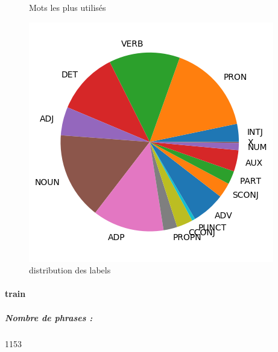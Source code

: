 \begin{figure}[H]
\begin{minipage}{0.48\textwidth}
\begin{tabular}{|l || *{11 }{|c} |}
\end{tabular}
\caption{ Mots les plus utilisés } \label{Fig:muw}\end{minipage} 
\begin{minipage}{0.48\textwidth} \centering
\includegraphics[width=.7\linewidth]{spokentest_img.png}
\caption{distribution des labels}
\end{minipage}
\end{figure} \paragraph{train } 
\subparagraph{Nombre de phrases :} 1153\\ 
